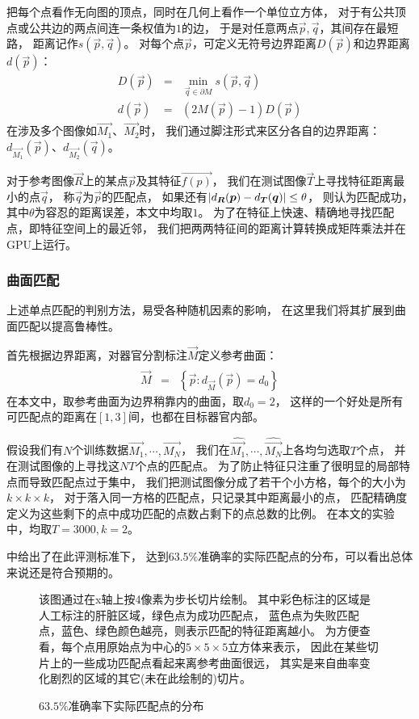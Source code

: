 把每个点看作无向图的顶点，同时在几何上看作一个单位立方体，
对于有公共顶点或公共边的两点间连一条权值为$1$的边，
于是对任意两点$\vec{p}, \vec{q}$，其间存在最短路，
距离记作$s(\vec{p}, \vec{q})$。
对每个点$\vec{p}$，可定义无符号边界距离$D(\vec{p})$和边界距离$d(\vec{p})$：
\begin{eqnarray}
    D(\vec{p}) &=& \min_{\vec{q} \in \partial M} s(\vec{p}, \vec{q}) \\
    d(\vec{p}) &=& (2M(\vec{p})-1)D(\vec{p})
\end{eqnarray}
在涉及多个图像如$\vec{M_1}$、$\vec{M_2}$时，
我们通过脚注形式来区分各自的边界距离：
$d_{\vec{M_1}}(\vec{p})$、$d_{\vec{M_2}}(\vec{q})$。

对于参考图像$\vec{R}$上的某点$\vec{p}$及其特征$\vec{f(p)}$，
我们在测试图像$\vec{T}$上寻找特征距离最小的点$\vec{q}$，
称$\vec{q}$为$\vec{p}$的匹配点，
如果还有$\left|d_{\boldsymbol{R}}(\boldsymbol{p}) - d_{\boldsymbol{T}}(\boldsymbol{q})\right| \le \theta$，
则认为匹配成功，其中$\theta$为容忍的距离误差，本文中均取$1$。
为了在特征上快速、精确地寻找匹配点，即特征空间上的最近邻，
我们把两两特征间的距离计算转换成矩阵乘法并在GPU上运行。

\subsubsection{曲面匹配\label{sec:expr:match}}
上述单点匹配的判别方法，易受各种随机因素的影响，
在这里我们将其扩展到曲面匹配以提高鲁棒性。

首先根据边界距离，对器官分割标注$\vec{M}$定义参考曲面：
\begin{eqnarray}
    \hat{\vec{M}} &=& \left\{ \vec{p} : d_{\vec{M}}(\vec{p}) = d_0 \right\}
\end{eqnarray}
在本文中，取参考曲面为边界稍靠内的曲面，取$d_0=2$，
这样的一个好处是所有可匹配点的距离在$[1, 3]$间，也都在目标器官内部。

假设我们有$N$个训练数据$\vec{M_1},\cdots,\vec{M_N}$，
我们在$\hat{\vec{M_1}},\cdots,\hat{\vec{M_N}}$上各均匀选取$T$个点，
并在测试图像的上寻找这$NT$个点的匹配点。
为了防止特征只注重了很明显的局部特点而导致匹配点过于集中，
我们把测试图像分成了若干个小方格，每个的大小为$k\times k \times k$，
对于落入同一方格的匹配点，只记录其中距离最小的点，
匹配精确度定义为这些剩下的点中成功匹配的点数占剩下的点总数的比例。
在本文的实验中，均取$T=3000, k=2$。

中给出了在此评测标准下，
达到$63.5\%$准确率的实际匹配点的分布，可以看出总体来说还是符合预期的。

\begin{figure}[h!]
    {
        \caption{$63.5\%$准确率下实际匹配点的分布}
        \label{fig:expr:match}
    }
    \footnotesize
    该图通过在x轴上按4像素为步长切片绘制。
    其中彩色标注的区域是人工标注的肝脏区域，绿色点为成功匹配点，
    蓝色点为失败匹配点，蓝色、绿色颜色越亮，则表示匹配的特征距离越小。
    为方便查看，每个点用原始点为中心的$5\times 5 \times 5$立方体来表示，
    因此在某些切片上的一些成功匹配点看起来离参考曲面很远，
    其实是来自曲率变化剧烈的区域的其它(未在此绘制的)切片。
\end{figure}


